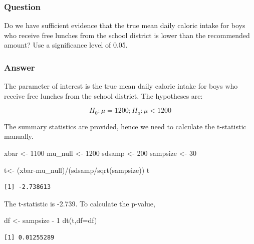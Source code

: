 \documentclass[
  letterpaper,
  DIV=11,
  numbers=noendperiod]{scrartcl}
\newenvironment{Shaded}{\begin{snugshade}}{\end{snugshade}}
\newcommand{\AttributeTok}[1]{\textcolor[rgb]{0.40,0.45,0.13}{#1}}
\newcommand{\DecValTok}[1]{\textcolor[rgb]{0.68,0.00,0.00}{#1}}
\newcommand{\FunctionTok}[1]{\textcolor[rgb]{0.28,0.35,0.67}{#1}}
\newcommand{\NormalTok}[1]{\textcolor[rgb]{0.00,0.23,0.31}{#1}}
\newcommand{\OtherTok}[1]{\textcolor[rgb]{0.00,0.23,0.31}{#1}}
\newcommand{\SpecialCharTok}[1]{\textcolor[rgb]{0.37,0.37,0.37}{#1}}
\begin{document}
\subsubsection{Question}

Do we have sufficient evidence that the true mean daily caloric intake
for boys who receive free lunches from the school district is lower than
the recommended amount? Use a significance level of 0.05.

\subsubsection{Answer}

The parameter of interest is the true mean daily caloric intake for boys
who receive free lunches from the school district. The hypotheses are:

\[
H_0: \mu = 1200; H_a: \mu < 1200
\]

The summary statistics are provided, hence we need to calculate the
t-statistic manually.

\begin{Shaded}
\begin{Highlighting}[]
\NormalTok{xbar }\OtherTok{\textless{}{-}} \DecValTok{1100}
\NormalTok{mu\_null }\OtherTok{\textless{}{-}} \DecValTok{1200}
\NormalTok{sdsamp }\OtherTok{\textless{}{-}} \DecValTok{200}
\NormalTok{sampsize }\OtherTok{\textless{}{-}} \DecValTok{30}

\NormalTok{t}\OtherTok{\textless{}{-}}\NormalTok{ (xbar}\SpecialCharTok{{-}}\NormalTok{mu\_null)}\SpecialCharTok{/}\NormalTok{(sdsamp}\SpecialCharTok{/}\FunctionTok{sqrt}\NormalTok{(sampsize))}
\NormalTok{t}
\end{Highlighting}
\end{Shaded}

\begin{verbatim}
[1] -2.738613
\end{verbatim}

The t-statistic is -2.739. To calculate the p-value,

\begin{Shaded}
\begin{Highlighting}[]
\NormalTok{df }\OtherTok{\textless{}{-}}\NormalTok{ sampsize }\SpecialCharTok{{-}} \DecValTok{1}
\FunctionTok{dt}\NormalTok{(t,}\AttributeTok{df=}\NormalTok{df)}
\end{Highlighting}
\end{Shaded}

\begin{verbatim}
[1] 0.01255289
\end{verbatim}
\end{document}

